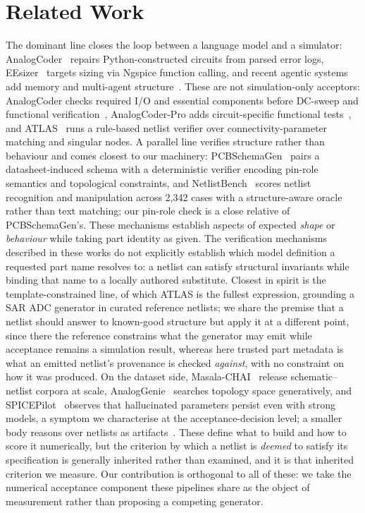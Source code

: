 \section{Related Work}
\label{sec:related}

The dominant line closes the loop between a language model and a simulator:
AnalogCoder~\cite{b2} repairs Python-constructed circuits from parsed error
logs, EEsizer~\cite{b1} targets sizing via Ngspice function calling, and
recent agentic systems add memory and multi-agent
structure~\cite{b17,b18,b20,b21}. These are not simulation-only acceptors:
AnalogCoder checks required I/O and essential components before DC-sweep and
functional verification~\cite{b2}, AnalogCoder-Pro adds circuit-specific
functional tests~\cite{b23}, and ATLAS~\cite{b19} runs a rule-based netlist
verifier over connectivity-parameter matching and singular nodes. A parallel
line verifies structure rather than behaviour and comes closest to our
machinery: PCBSchemaGen~\cite{b24} pairs a datasheet-induced schema with a
deterministic verifier encoding pin-role semantics and topological
constraints, and NetlistBench~\cite{b25} scores netlist recognition and
manipulation across 2{,}342 cases with a structure-aware oracle rather than
text matching; our pin-role check is a close relative of PCBSchemaGen's.
These mechanisms establish aspects of expected \emph{shape} or
\emph{behaviour} while taking part identity as given. The verification
mechanisms described in these works do not explicitly establish which model
definition a requested part name resolves to: a netlist can satisfy structural
invariants while binding that name to a locally authored substitute. Closest
in spirit is the template-constrained
line, of which ATLAS is the fullest expression, grounding a SAR ADC generator
in curated reference netlists; we share the premise that a netlist should
answer to known-good structure but apply it at a different point, since there
the reference constrains what the generator may emit while acceptance remains
a simulation result, whereas here trusted part metadata is what an emitted
netlist's provenance is checked \emph{against}, with no constraint on how it
was produced. On the dataset side, Masala-CHAI~\cite{b6} release schematic--netlist corpora at scale,
AnalogGenie~\cite{b22} searches topology space generatively, and
SPICEPilot~\cite{b8} observes that hallucinated parameters persist even with
strong models, a symptom we characterise at the acceptance-decision level;
a smaller body reasons over netlists as artifacts~\cite{b3,b4,b5}. These
define what to build and how to score it numerically, but the criterion by
which a netlist is \emph{deemed} to satisfy its specification is generally
inherited rather than examined, and it is that inherited criterion we
measure. Our contribution is orthogonal to all of these: we take the
numerical acceptance component these pipelines share as the object of
measurement rather than proposing a competing generator.

